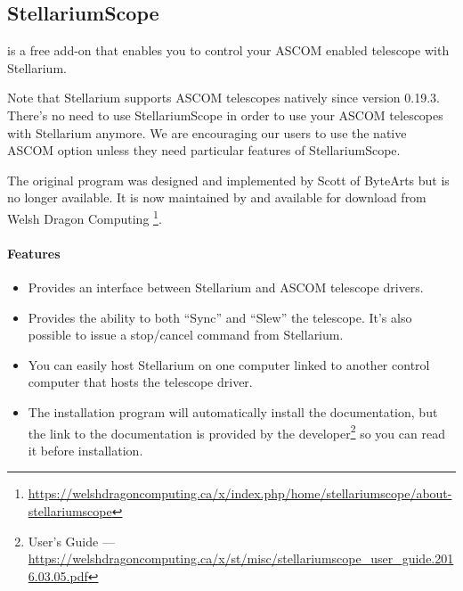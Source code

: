 \subsection{StellariumScope}
\label{sec:plugins:StellariumScope}
 is a free add-on that enables you to control your ASCOM enabled telescope with Stellarium. 

Note that Stellarium supports ASCOM telescopes natively since version 0.19.3. There's no need to 
  use StellariumScope in order to use your ASCOM telescopes with Stellarium anymore. We are 
  encouraging our users to use the native ASCOM option unless they need particular features of StellariumScope.



The original  program was designed and implemented by Scott of ByteArts
but is no longer available. 
It is now maintained by and available for download from Welsh Dragon Computing
\footnote{\url{https://welshdragoncomputing.ca/x/index.php/home/stellariumscope/about-stellariumscope}}.

\paragraph{Features}
\begin{itemize}
\item Provides an interface between Stellarium and ASCOM telescope drivers.
\item Provides the ability to both ``Sync'' and ``Slew'' the
  telescope. It's also possible to issue a stop/cancel command from
  Stellarium.
\item You can easily host Stellarium on one computer linked to another
  control computer that hosts the telescope driver.
\item The installation program will automatically install the
  documentation, but the link to the documentation is provided
  by the developer\footnote{ User's Guide --- \url{https://welshdragoncomputing.ca/x/st/misc/stellariumscope_user_guide.2016.03.05.pdf}} so you can read it before installation.
\end{itemize}

